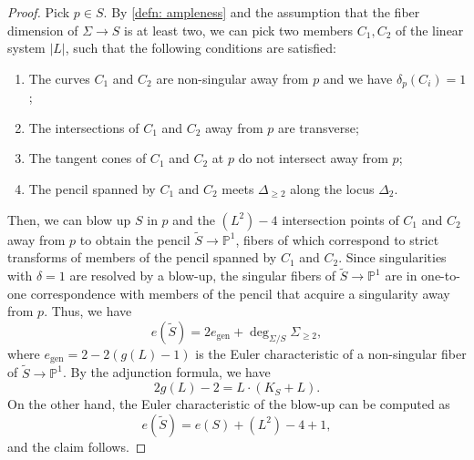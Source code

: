 \documentclass[11pt]{amsart}
\theoremstyle{plain}
\theoremstyle{definition}
\theoremstyle{remark}
\begin{document}
\begin{proof}
Pick $p \in S$. By \ref{defn: ampleness} and the assumption that the fiber dimension of $\Sigma \to S$ is at least two, we can pick two members $C_1, C_2$ of the linear system $|L|$, such that the following conditions are satisfied: 
\begin{enumerate}
\item The curves $C_1$ and $C_2$ are non-singular away from $p$ and we have $\delta_p(C_i) = 1$;
\item The intersections of $C_1$ and $C_2$ away from $p$ are transverse;
\item The tangent cones of $C_1$ and $C_2$ at $p$ do not intersect away from $p$;
\item The pencil spanned by $C_1$ and $C_2$ meets $\Delta_{\geq 2}$ along the locus $\Delta_{2}$.
\end{enumerate}
Then, we can blow up $S$ in $p$ and the $(L^2)-4$ intersection points of $C_1$ and $C_2$ away from $p$ to obtain the pencil $\widetilde{S} \to \mathbb P^1$, fibers of which correspond to strict transforms of members of the pencil spanned by $C_1$ and $C_2$. Since singularities with $\delta = 1$ are resolved by a blow-up, the singular fibers of $\widetilde{S} \to \mathbb P^1$ are in one-to-one correspondence with members of the pencil that acquire a singularity away from $p$.
Thus, we have 
$$e(\widetilde{S}) = 2e_{\mathrm{gen}} + \deg_{\Sigma/S} \Sigma_{\geq 2},$$
where $e_{\mathrm{gen}} = 2 - 2(g(L) - 1)$ is the Euler characteristic of a non-singular fiber of $\widetilde{S} \to \mathbb P^1$. By the adjunction formula, we have
\[
2 g(L) - 2 = L\cdot (K_S + L).
\]
On the other hand, the Euler characteristic of the blow-up can be computed as $$e(\widetilde{S}) = e(S) + (L^2) - 4 + 1,$$ and the claim follows.
\end{proof}
\end{document}
